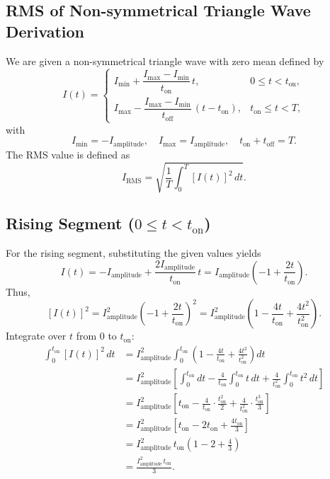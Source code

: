 \documentclass{article}
\begin{document}
\subsection{RMS of Non-symmetrical Triangle Wave Derivation}
We are given a non-symmetrical triangle wave with zero mean defined by
\[
I(t) =
\begin{cases}
I_{\min} + \dfrac{I_{\max}-I_{\min}}{t_{\text{on}}}\,t, & 0\le t < t_{\text{on}}, \\[1mm]
I_{\max} - \dfrac{I_{\max}-I_{\min}}{t_{\text{off}}}\,(t-t_{\text{on}}), & t_{\text{on}}\le t < T,
\end{cases}
\]
with
\[
I_{\min} = -I_{\text{amplitude}}, \quad I_{\max} = I_{\text{amplitude}}, \quad t_{\text{on}} + t_{\text{off}} = T.
\]
The RMS value is defined as
\[
I_{\text{RMS}} = \sqrt{\frac{1}{T}\int_0^T [I(t)]^2\,dt}.
\]

\subsection{Rising Segment ($0\le t < t_{\text{on}}$)}

For the rising segment, substituting the given values yields
\[
I(t) = -I_{\text{amplitude}} + \frac{2I_{\text{amplitude}}}{t_{\text{on}}}\,t = I_{\text{amplitude}}\left(-1 + \frac{2t}{t_{\text{on}}}\right).
\]
Thus,
\[
[I(t)]^2 = I_{\text{amplitude}}^2 \left(-1 + \frac{2t}{t_{\text{on}}}\right)^2
= I_{\text{amplitude}}^2 \left(1 - \frac{4t}{t_{\text{on}}} + \frac{4t^2}{t_{\text{on}}^2}\right).
\]
Integrate over \(t\) from 0 to \(t_{\text{on}}\):
\begin{align*}
\int_0^{t_{\text{on}}} [I(t)]^2\, dt 
&= I_{\text{amplitude}}^2 \int_0^{t_{\text{on}}} \left(1 - \frac{4t}{t_{\text{on}}} + \frac{4t^2}{t_{\text{on}}^2}\right) dt \\
&= I_{\text{amplitude}}^2 \left[ \int_0^{t_{\text{on}}} dt - \frac{4}{t_{\text{on}}}\int_0^{t_{\text{on}}} t\,dt + \frac{4}{t_{\text{on}}^2}\int_0^{t_{\text{on}}} t^2\,dt \right] \\
&= I_{\text{amplitude}}^2 \left[ t_{\text{on}} - \frac{4}{t_{\text{on}}}\cdot\frac{t_{\text{on}}^2}{2} + \frac{4}{t_{\text{on}}^2}\cdot\frac{t_{\text{on}}^3}{3} \right] \\
&= I_{\text{amplitude}}^2 \left[ t_{\text{on}} - 2t_{\text{on}} + \frac{4t_{\text{on}}}{3} \right] \\
&= I_{\text{amplitude}}^2\,t_{\text{on}} \left(1 - 2 + \frac{4}{3}\right) \\
&= \frac{I_{\text{amplitude}}^2\,t_{\text{on}}}{3}.
\end{align*}
\end{document}
